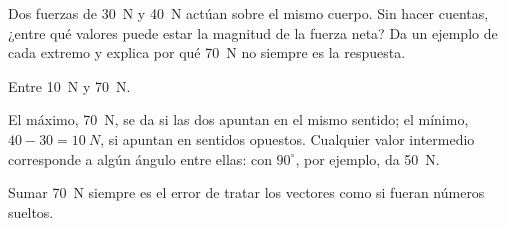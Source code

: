 \documentclass[11pt]{article}
\begin{document}
\begin{preguntas}
\pregunta[1] Dos fuerzas de \qty{30}{N} y \qty{40}{N} actúan sobre el mismo cuerpo. Sin hacer
cuentas, ¿entre qué valores puede estar la magnitud de la fuerza neta? Da un ejemplo de cada
extremo y explica por qué \qty{70}{N} no siempre es la respuesta.
\begin{solucion}[4.5cm]
Entre \qty{10}{N} y \qty{70}{N}.

El máximo, \qty{70}{N}, se da si las dos apuntan en el mismo sentido; el mínimo,
$40 - 30 = \qty{10}{N}$, si apuntan en sentidos opuestos. Cualquier valor intermedio
corresponde a algún ángulo entre ellas: con $90^\circ$, por ejemplo, da \qty{50}{N}.

Sumar \qty{70}{N} siempre es el error de tratar los vectores como si fueran números sueltos.
\end{solucion}

\end{preguntas}
\end{document}
